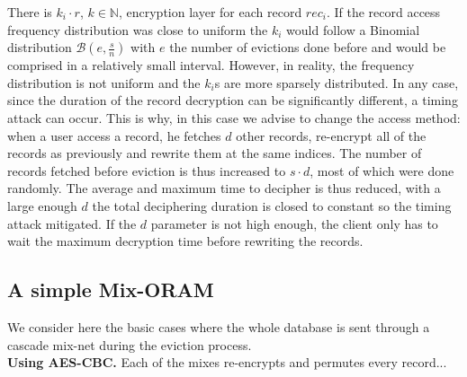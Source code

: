 \documentclass{llncs}
\begin{document}
There is $k_i \cdot r$, $k\in \mathbb{N}$, encryption layer for each record $rec_i$. If the record access frequency distribution was close to uniform the $k_i$ would follow a Binomial distribution $\mathcal{B}\left ( e, \frac{s}{n}\right )$ with $e$ the number of evictions done before and would be comprised in a relatively small interval. However, in reality, the frequency distribution is not uniform and the $k_i$s are more sparsely distributed. In any case, since the duration of the record decryption can be significantly different, a timing attack can occur. This is why, in this case we advise to change the access method: when a user access a record, he fetches $d$ other records, re-encrypt all of the records as previously and rewrite them at the same indices. The number of records fetched before eviction is thus increased to $s\cdot d$, most of which were done randomly. The average and maximum time to decipher is thus reduced, with a large enough $d$ the total deciphering duration is closed to constant so the timing attack mitigated. If the $d$ parameter is not high enough, the client only has to wait the maximum decryption time before rewriting the records.

\subsection{A simple Mix-ORAM}\label{SMO}
%
We consider here the basic cases where the whole database is sent through a cascade mix-net during the eviction process.\\

\noindent\textbf{Using AES-CBC.} Each of the mixes re-encrypts and permutes every record...
\end{document}
